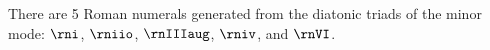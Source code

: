 
There are 5 Roman numerals generated from the diatonic
triads of the minor mode: $\rni$, $\rniio$, $\rnIIIaug$,
$\rniv$, and $\rnVI$.

